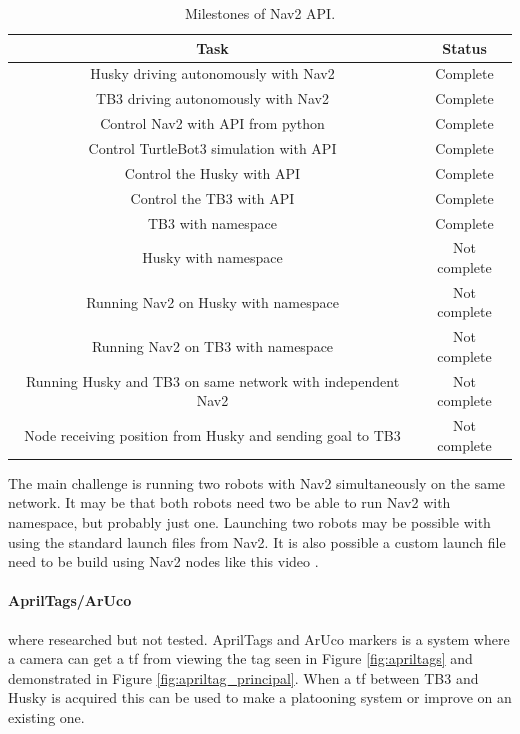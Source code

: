 \begin{table}[H]
    \centering
    \caption{Milestones of Nav2 API.}
    \begin{tabular}{c|c}
        Task                                                        & Status   \\ \hline
        Husky driving autonomously with Nav2                        & Complete \\
        TB3 driving autonomously with Nav2                          & Complete \\
        Control Nav2 with API from python                           & Complete \\
        Control TurtleBot3 simulation with API                      & Complete \\
        Control the Husky with API                                  & Complete \\
        Control the TB3 with API                                    & Complete \\
        TB3 with namespace                                          & Complete \\
        Husky with namespace                                        & Not complete \\
        Running Nav2 on Husky with namespace                        & Not complete \\
        Running Nav2 on TB3 with namespace                          & Not complete \\
        Running Husky and TB3 on same network with independent Nav2 & Not complete\\
        Node receiving position from Husky and sending goal to TB3  & Not complete \\
    \end{tabular}
    \label{tab:MilestonesNav2API}
\end{table}

The main challenge is running two robots with Nav2 simultaneously on the same network. It may be that both robots need two be able to run Nav2 with namespace, but probably just one. Launching two robots may be possible with using the standard launch files from Nav2. It is also possible a custom launch file need to be build using Nav2 nodes like this video \cite{MultiRobotNav2}.
   

\paragraph{AprilTags/ArUco} where researched but not tested. AprilTags and ArUco markers is a system where a camera can get a tf from viewing the tag seen in Figure \ref{fig:apriltags} and demonstrated in Figure \ref{fig:apriltag_principal}. When a tf between TB3 and Husky is acquired this can be used to make a platooning system or improve on an existing one. 

